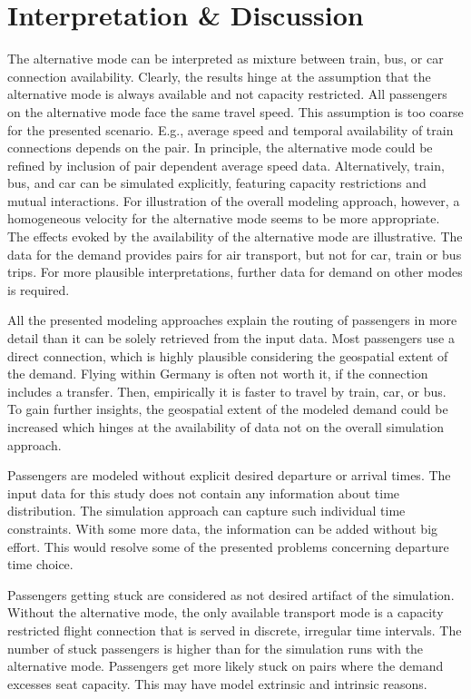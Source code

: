 \section{Interpretation \& Discussion}
\label{sec:air_rail_discussion}
The alternative mode can be interpreted as mixture between train, bus, or car connection availability. 
Clearly, the results hinge at the assumption that the alternative mode is always available and not capacity restricted.  
All passengers on the alternative mode face the same travel speed. 
This assumption is too coarse for the presented scenario. 
E.g., average speed and temporal availability of train connections depends on the  pair. 
In principle, the alternative mode could be refined by inclusion of  pair dependent average speed data. 
Alternatively, train, bus, and car can be simulated explicitly, featuring capacity restrictions and mutual interactions. 
For illustration of the overall modeling approach, however, a homogeneous velocity for the alternative mode seems to be more appropriate. 
The effects evoked by the availability of the alternative mode are illustrative. 
The data for the demand provides  pairs for air transport, but not for car, train or bus trips.  
For more plausible interpretations, further data for demand on other modes is required. 

All the presented modeling approaches explain the routing of passengers in more detail than it can be solely retrieved from the input data.  
Most passengers use a direct connection, which is highly plausible considering the geospatial extent of the demand.  
Flying within Germany is often not worth it, if the connection includes a transfer. 
Then, empirically it is faster to travel by train, car, or bus. 
To gain further insights, the geospatial extent of the modeled demand could be increased which hinges at the availability of data not on the overall simulation approach. 

Passengers are modeled without explicit desired departure or arrival times. 
The input data for this study does not contain any information about time distribution. 
The simulation approach can capture such individual time constraints.  
With some more data, the information can be added without big effort. 
This would resolve some of the presented problems concerning departure time choice. 

Passengers getting stuck are considered as not desired artifact of the simulation. 
Without the alternative mode, the only available transport mode is a capacity restricted flight connection that is served in discrete, irregular time intervals. 
The number of stuck passengers is higher than for the simulation runs with the alternative mode. 
Passengers get more likely stuck on  pairs where the demand excesses seat capacity. 
This may have model extrinsic and intrinsic reasons. 

